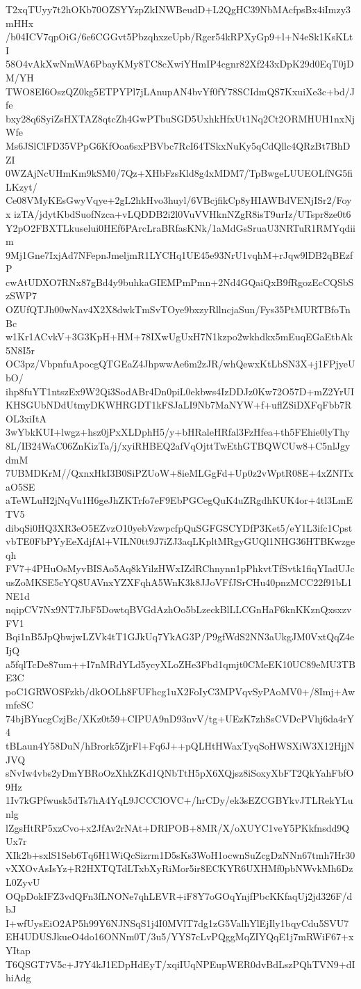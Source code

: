 T2xqTUyy7t2hOKb70OZSYYzpZkINWBeudD+L2QgHC39NbMAcfpsBx4iImzy3mHHx
/b04ICV7qpOiG/6e6CGGvt5PbzqhxzeUpb/Rger54kRPXyGp9+l+N4eSk1KsKLtI
58O4vAkXwNmWA6PbayKMy8TC8cXwiYHmIP4cgnr82Xf243xDpK29d0EqT0jDM/YH
TWO8EI6OszQZ0kg5ETPYPl7jLAnupAN4bvYf0fY78SCIdmQS7KxuiXe3c+bd/Jfe
bxy28q6SyiZsHXTAZ8qtcZh4GwPTbuSGD5UxhkHfxUt1Nq2Ct2ORMHUH1nxNjWfe
Ms6JSlClFD35VPpG6KfOoa6sxPBVbc7RcI64TSkxNuKy5qCdQllc4QRzBt7BhDZI
0WZAjNcUHmKm9kSM0/7Qz+XHbFzsKld8g4xMDM7/TpBwgeLUUEOLfNG5fiLKzyt/
Ce08VMyKEsGwyVqye+2gL2hkHvo3huyl/6VBcjfikCp8yHIAWBdVENjISr2/Foyx
izTA/jdytKbdSuofNzca+vLQDDB2i2l0VuVVHknNZgR8isT9urIz/UTspr8ze0t6
Y2pO2FBXTLkuselui0HEf6PArcLraBRfasKNk/1aMdGsSruaU3NRTuR1RMYqdiim
9Mj1Gne7IxjAd7NFepnJmeljmR1LYCHq1UE45e93NrU1vqhM+rJqw9lDB2qBEzfP
cwAtUDXO7RNx87gBd4y9buhkaGIEMPmPmn+2Nd4GQaiQxB9fRgozEcCQSbSzSWP7
OZUfQTJh00wNav4X2X8dwkTmSvTOye9bxzyRllncjaSun/Fys35PtMURTBfoTnBc
w1Kr1ACvkV+3G3KpH+HM+78IXwUgUxH7N1kzpo2wkhdkx5mEuqEGaEtbAk5N8I5r
OC3pz/VbpnfuApocgQTGEaZ4JhpwwAe6m2zJR/whQewxKtLbSN3X+j1FPjyeUbO/
ihp8fuYT1ntszEx9W2Qi3SodABr4Dn0piL0ekbws4IzDDJz0Kw72O57D+mZ2YrUI
KHSGUbNDdUtmyDKWHRGDT1kFSJaLI9Nb7MaNYW+f+uflZSiDXFqFbb7ROL3xiItA
3wYbkKUI+lwgz+hsz0jPxXLDphH5/y+bHRaleHRfal3FzHfea+th5FEhie0lyThy
8L/IB24WaC06ZnKizTa/j/xyiRHBEQ2afVqOjttTwEthGTBQWCUw8+C5nlJgydmM
7UBMDKrM//QxnxHkI3B0SiPZUoW+8ieMLGgFd+Up0z2vWptR08E+4xZNlTxaO5SE
aTeWLuH2jNqVu1H6geJhZKTrfo7eF9EbPGCegQuK4uZRgdhKUK4or+4tl3LmETV5
dibqSi0HQ3XR3eO5EZvzO10yebVzwpcfpQuSGFGSCYDfP3Ket5/eY1L3ifc1Cpst
vbTE0FbPYyEeXdjfAl+VILN0tt9J7iZJ3aqLKpltMRgyGUQl1NHG36HTBKwzgeqh
FV7+4PHuOsMyvBISAo5Aq8kYilzHWxIZdRChnynn1pPhkvtTfSvtk1fiqYIadUJc
usZoMKSE5cYQ8UAVnxYZXFqhA5WnK3k8JJoVFfJSrCHu40pnzMCC22f91bL1NE1d
nqipCV7Nx9NT7JbF5DowtqBVGdAzhOo5bLzeckBlLLCGnHaF6knKKznQxsxzvFV1
Bqi1nB5JpQbwjwLZVk4tT1GJkUq7YkAG3P/P9gfWdS2NN3aUkgJM0VxtQqZ4eIjQ
a5fqlTcDe87um++I7nMRdYLd5ycyXLoZHe3Fbd1qmjt0CMeEK10UC89eMU3TBE3C
poC1GRWOSFzkb/dkOOLh8FUFhcg1uX2FoIyC3MPVqvSyPAoMV0+/8Imj+AwmfeSC
74bjBYucgCzjBc/XKz0t59+CIPUA9nD93nvV/tg+UEzK7zhSsCVDcPVhj6da4rY4
tBLaun4Y58DuN/hBrork5ZjrFl+Fq6J++pQLHtHWaxTyqSoHWSXiW3X12HjjNJVQ
sNvIw4vbs2yDmYBRoOzXhkZKd1QNbTtH5pX6XQjsz8iSoxyXbFT2QkYahFbfO9Hz
1Iv7kGPfwusk5dTs7hA4YqL9JCCClOVC+/hrCDy/ek3sEZCGBYkvJTLRekYLunlg
lZgsHtRP5xzCvo+x2JfAv2rNAt+DRIPOB+8MR/X/oXUYC1veY5PKkfnsdd9QUx7r
XIk2b+sxlS1Seb6Tq6H1WiQcSizrm1D5sKs3WoH1ocwnSuZcgDzNNn67tmh7Hr30
vXXOvAsIsYz+R2HXTQTdLTxbXyRiMor5ir8ECKYR6UXHMf0pbNWvkMh6DzL0ZyvU
OQpDokIFZ3vdQFn3fLNONe7qhLEVR+iF8Y7oGOqYnjfPbcKKfaqUj2jd326F/dbJ
I+wfUysEiO2AP5h99Y6NJNSqS1j4I0MVlT7dg1zG5ValhYlEjIly1bqyCdu5SVU7
EH4UDUSJkueO4do16ONNm0T/3u5/YYS7cLvPQggMqZIYQqE1j7mRWiF67+xYItap
T6QSGT7V5c+J7Y4kJ1EDpHdEyT/xqiIUqNPEupWER0dvBdLszPQhTVN9+dIhiAdg
